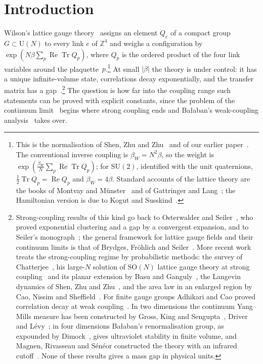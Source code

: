 \documentclass[11pt]{amsart}
\theoremstyle{definition}
\theoremstyle{remark}
\numberwithin{equation}{section}
\newcommand{\Z}{\mathbb{Z}}
\newcommand{\SU}{\mathrm{SU}}
\newcommand{\SO}{\mathrm{SO}}
\newcommand{\U}{\mathrm{U}}
\newcommand{\Tr}{\operatorname{Tr}}
\newcommand{\ReTr}{\operatorname{Re}\operatorname{Tr}}
\begin{document}
\maketitle
\enlargethispage{8pt}


\section{Introduction}\label{sec:intro}

Wilson's lattice gauge theory~\cite{Wil74} assigns an element $Q_e$ of a
compact group $G\subset\U(N)$ to every link $e$ of $\Z^4$ and weighs a
configuration by $\exp(N\beta\sum_p\ReTr Q_p)$, where $Q_p$ is the ordered
product of the four link variables around the plaquette~$p$.\footnote{This is
the normalisation of Shen, Zhu and Zhu~\cite{SZZ23} and of our earlier
paper~\cite{BB26a}. The conventional inverse coupling is $\beta_W=N^2\beta$,
so the weight is $\exp(\frac{\beta_W}N\sum_p\ReTr Q_p)$; for $\SU(2)$,
identified with the unit quaternions, $\frac12\Tr Q_p=\operatorname{Re}Q_p$
and $\beta_W=4\beta$. Standard accounts of the lattice theory are the books
of Montvay and M\"unster~\cite{MM94} and of Gattringer and
Lang~\cite{GL10}; the Hamiltonian version is due to Kogut and
Susskind~\cite{KS75}.} At small $|\beta|$ the theory is under control: it has
a unique infinite-volume state, correlations decay exponentially, and the
transfer matrix has a gap~\cite{OSei78,Sei82}.\footnote{Strong-coupling results of this kind go back to
Osterwalder and Seiler~\cite{OSei78}, who proved exponential clustering and
a gap by a convergent expansion, and to Seiler's monograph~\cite{Sei82}; the
general framework for lattice gauge fields and their continuum limits is
that of Brydges, Fr\"ohlich and Seiler~\cite{BFS79}. More recent work treats
the strong-coupling regime by probabilistic methods: the survey of
Chatterjee~\cite{Chat19}, his large-$N$ solution of $\SO(N)$ lattice gauge
theory at strong coupling~\cite{Chat19b} and its planar extension by Basu
and Ganguly~\cite{BG18}, the Langevin dynamics of Shen, Zhu and
Zhu~\cite{SZZ23}, and the area law in an enlarged region by Cao, Nissim and
Sheffield~\cite{CNS25}. For finite gauge groups Adhikari and Cao proved
correlation decay at weak coupling~\cite{AC25}. In two dimensions the
continuum Yang--Mills measure has been constructed by Gross, King and
Sengupta~\cite{GKS89}, Driver~\cite{Dri89} and L\'evy~\cite{Lev03}; in four
dimensions Ba{\l}aban's renormalisation group, as expounded by
Dimock~\cite{Dim13}, gives ultraviolet stability in finite volume, and
Magnen, Rivasseau and S\'en\'eor constructed the theory with an infrared
cutoff~\cite{MRS93}. None of these results gives a mass gap in physical
units.} The question is how far into
the coupling range such statements can be proved with explicit constants,
since the problem of the continuum limit~\cite{JW06} begins where strong
coupling ends and Ba{\l}aban's weak-coupling
analysis~\cite{Bal84a,Bal85a,Bal89b} takes over.
\end{document}
